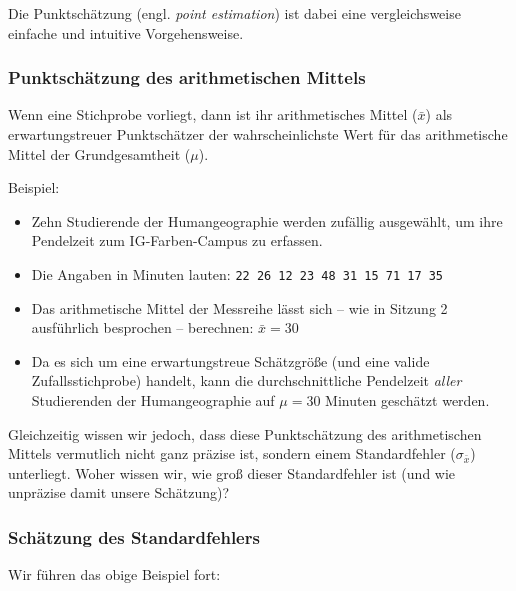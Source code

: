 \documentclass[
  ngerman,
]{article}
\providecommand{\tightlist}{%
  \setlength{\itemsep}{0pt}\setlength{\parskip}{0pt}}
\begin{document}
Die Punktschätzung (engl. \emph{point estimation}) ist dabei eine vergleichsweise einfache und intuitive Vorgehensweise.

\hypertarget{punktschuxe4tzung-des-arithmetischen-mittels}{%
\subsubsection{Punktschätzung des arithmetischen Mittels}\label{punktschuxe4tzung-des-arithmetischen-mittels}}

Wenn eine Stichprobe vorliegt, dann ist ihr arithmetisches Mittel (\(\bar{x}\)) als erwartungstreuer Punktschätzer der wahrscheinlichste Wert für das arithmetische Mittel der Grundgesamtheit (\(\mu\)).

Beispiel:

\begin{itemize}
\tightlist
\item
  Zehn Studierende der Humangeographie werden zufällig ausgewählt, um ihre Pendelzeit zum IG-Farben-Campus zu erfassen.
\item
  Die Angaben in Minuten lauten:
  \texttt{22\ 26\ 12\ 23\ 48\ 31\ 15\ 71\ 17\ 35}
\item
  Das arithmetische Mittel der Messreihe lässt sich -- wie in Sitzung 2 ausführlich besprochen -- berechnen: \(\bar{x}=30\)
\item
  Da es sich um eine erwartungstreue Schätzgröße (und eine valide Zufallsstichprobe) handelt, kann die durchschnittliche Pendelzeit \emph{aller} Studierenden der Humangeographie auf \(\mu=30\) Minuten geschätzt werden.
\end{itemize}

Gleichzeitig wissen wir jedoch, dass diese Punktschätzung des arithmetischen Mittels vermutlich nicht ganz präzise ist, sondern einem Standardfehler (\(\sigma_{\bar{x}}\)) unterliegt. Woher wissen wir, wie groß dieser Standardfehler ist (und wie unpräzise damit unsere Schätzung)?

\hypertarget{schuxe4tzung-des-standardfehlers}{%
\subsubsection{Schätzung des Standardfehlers}\label{schuxe4tzung-des-standardfehlers}}

Wir führen das obige Beispiel fort:
\end{document}
